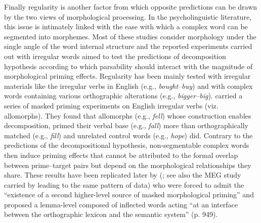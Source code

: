 \documentclass[output=paper]{langsci/langscibook}
\begin{document}
Finally regularity is another factor from which opposite predictions
can be drawn by the two views of morphological processing. In the
psycholinguistic literature, this issue is intimately linked with the
ease with which a complex word can be segmented into morphemes. Most of
these studies consider morphology under the single angle of the word
internal structure and the reported experiments carried out with
irregular words aimed to test the predictions of decomposition
hypothesis according to which parsability should interact with the
magnitude of morphological priming effects. Regularity has been mainly
tested with irregular materials like the irregular verbs in English
(e.g., \emph{bought--buy}) and with complex words containing
various orthographic alterations (e.g., \emph{bigger--big}).
%
\citet{PastizzoFeldman2002} %
%
carried a series of masked priming
experiments on English irregular verbs (viz. allomorphs). They found
that allomorphs (e.g., \emph{fell}) whose construction enables
decomposition, primed their verbal base (e.g., \emph{fall}) more than
orthographically matched (e.g., \emph{fill}) and unrelated control words
(e.g., \emph{hope}) did. Contrary to the predictions of the
decompositional hypothesis, non-segmentable complex words then induce
priming effects that cannot be attributed to the formal overlap between
prime--target pairs but depend on the morphological relationships they
share. These results have been replicated later by %
\citeauthor{CrepaldiRastleDavis2010} (\citeyear{CrepaldiRastleDavis2010}; see also the MEG study carried by \citealt{FruchterStockallEtAl2013} leading to the same pattern of data) %
%
who were
forced to admit the ``existence of a second higher-level source of
masked morphological priming'' and proposed a lemma-level composed of
inflected words acting ``at an interface between the orthographic
lexicon and the semantic system'' (p. 949).
\end{document}
